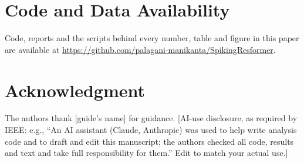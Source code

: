 \documentclass[conference]{IEEEtran}
\begin{document}
\section*{Code and Data Availability}
Code, reports and the scripts behind every number, table and figure in this paper are available at \url{https://github.com/palagani-manikanta/SpikingResformer}.

\section*{Acknowledgment}
The authors thank [guide's name] for guidance. [AI-use disclosure, as required by IEEE: e.g., ``An AI assistant (Claude, Anthropic) was used to help write analysis code and to draft and edit this manuscript; the authors checked all code, results and text and take full responsibility for them.'' Edit to match your actual use.]



\end{document}
